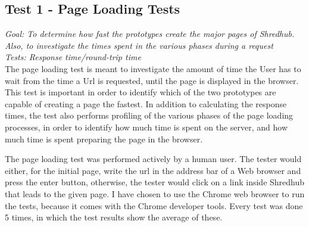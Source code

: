 \subsection{Test 1 - Page Loading Tests}
\textit{Goal: To determine how fast the prototypes create the major pages of Shredhub. Also, to investigate the times spent in the various phases during a request}\\
\textit{Tests: Response time/round-trip time}\\
The page loading test is meant to investigate the amount of time the User has to wait from the time a Url is requested, until the  page is displayed in the browser. This test is important in order to identify which of the two prototypes are capable of creating a page the fastest.  In addition to calculating the response times, the test also performs profiling of the various phases of the page loading processes, in order to identify how much time is spent on the server, and how much time is spent preparing the page in the browser.

The page loading test was performed actively by a human user. The tester would either, for the initial page, write the url in the address bar of a Web browser and press the enter button, otherwise, the tester would click on a link inside Shredhub that leads to the given page. I have chosen to use the Chrome web browser to run the tests, because it comes with the Chrome developer tools. Every test was done 5 times, in which the test results show the average of these.

